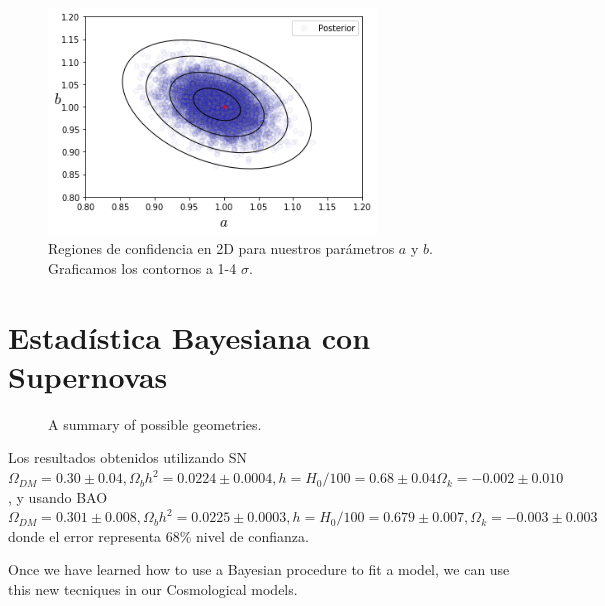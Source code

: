 \documentclass[10.5pt,prb,
               showpacs,            %
               preprintnumbers,     %
               aps,                 %
               prl,          	    %
               letterpaper,             %
               superscriptaddress,      %
               nofootinbib,         %
               tightenlines,        %
               floats,floatfix      %
               ,usenatbib]{revtex4-1}%
\newcommand{\jav}[1]{\textcolor{red}{(jav: #1)}}
\begin{document}
\begin{figure}[ht] 
\includegraphics[trim = 1mm  1mm 1mm 1mm, clip, width=6.cm, height=6cm]{cab.png}
\caption{Regiones de confidencia en 2D para nuestros par\'ametros $a$ y $b$. Graficamos los contornos a 1-4 $\sigma$.}%
\label{confidence}
\end{figure}


\section{Estad\'istica Bayesiana con Supernovas}



\begin{figure}[th]
\begin{center}
\end{center}
\caption[Geometries of the spacetime]
{A summary of possible geometries.}
\label{Fig:cmb_sh}
\end{figure}

Los resultados obtenidos utilizando SN $\Omega_{DM} =0.30 \pm 0.04, \Omega_b h^2 = 0.0224 \pm 0.0004, h = H_0/100 = 0.68 \pm 0.04
\Omega_k = -0.002 \pm 0.010$, y usando BAO 
$\Omega_{DM} = 0.301 \pm 0.008,   \Omega_b h^2 = 0.0225 \pm 0.0003,  h = H_0/100 = 0.679 \pm 0.007, 
\Omega_k = -0.003 \pm 0.003$ donde el error representa 68\% nivel de confianza.



Once we have learned how to use a Bayesian procedure to fit a model, we can use this new tecniques in our Cosmological models. 





\end{document}

